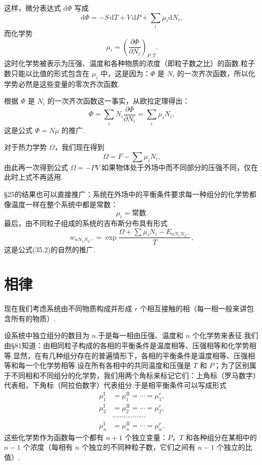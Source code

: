 这样，微分表达式 $\mathrm{d}\Phi$ 写成
\begin{equation*}
  \mathrm{d}\Phi=-S\,\mathrm{d}T+V\,\mathrm{d}P+\sum_i\mu_i\mathrm{d}N_i,
\end{equation*}
而化学势
\begin{equation}
  \mu_i=\left(\frac{\partial\Phi}{\partial N_i}\right)_{P,T}.
\end{equation}
这时化学势被表示为压强、温度和各种物质的浓度（即粒子数之比）的函数.粒子数只能以比值的形式包含在 $\mu_i$ 中，这是因为：$\Phi$ 是 $N_i$ 的一次齐次函数，所以化学势必然是这些变量的零次齐次函数.

根据 $\Phi$ 是 $N_i$ 的一次齐次函数这一事实，从欧拉定理得出：
\begin{equation}
  \Phi=\sum_iN_i\frac{\partial\Phi}{\partial N_i}=\sum_i\mu_iN_i,
\end{equation}
这是公式 $\varPhi=N\mu$ 的推广.

对于热力学势 $\varOmega$，我们现在得到
\begin{equation*}
  \varOmega=F-\sum\mu_iN_i,
\end{equation*}
由此再一次得到公式 $\varOmega=-PV$.如果物体处于外场中而不同部分的压强不同，仅在此时上式不再适用.

§25的结果也可以直接推广：系统在外场中的平衡条件要求每一种组分的化学势都像温度一样在整个系统中都是常数：
\begin{equation}
  \mu_i=\text{常数}.
\end{equation}
最后，由不同粒子组成的系统的吉布斯分布具有形式
\begin{equation}
  w_{nN_1N_2\cdots}
  =\exp\frac{\varOmega+\sum\mu_iN_i-E_{nN_1N_2\cdots}}{T},
\end{equation}
这是公式(35.2)的自然的推广.

\section{相律}

现在我们考虑系统由不同物质构成并形成 $r$ 个相互接触的相（每一相一般来讲包含所有的物质）.

设系统中独立组分的数目为 $n$.于是每一相由压强、温度和 $n$ 个化学势来表征.我们由§81知道：由相同粒子构成的各相的平衡条件是温度相等、压强相等和化学势相等.显然，在有几种组分存在的普遍情形下，各相的平衡条件是温度相等、压强相等和每一个化学势相等.设在所有各相中的共同温度和压强是 $T$ 和 $P$；为了区别属于不同相和不同组分的化学势，我们用两个角标来标记它们：上角标（罗马数字）代表相，下角标（阿拉伯数字）代表组分.于是相平衡条件可以写成形式
\begin{equation}
\begin{aligned}
  \mu_1^{\mathrm{I}}&=\mu_1^{\mathrm{II}}=\cdots=\mu_1^{r},\\
  \mu_2^{\mathrm{I}}&=\mu_2^{\mathrm{II}}=\cdots=\mu_2^{r},\\
  &\cdots\cdots\cdots\cdots\cdots\cdots\\
  \mu_n^{\mathrm{I}}&=\mu_n^{\mathrm{II}}=\cdots=\mu_n^{r}.
\end{aligned}
\end{equation}
这些化学势作为函数每一个都有 $n+1$ 个独立变量：$P$，$T$ 和各种组分在某相中的 $n-1$ 个浓度（每相有 $n$ 个独立的不同种粒子数，它们之间有 $n-1$ 个独立的比值）.

